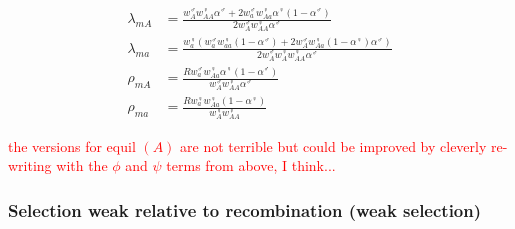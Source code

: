 \documentclass[12pt]{article}
\begin{document}
\begin{subequations}
\begin{align}
\lambda_{mA}&=\frac{w_{A}^\male w_{AA}^\female \alpha^\male + 2 w_{a}^\male w_{Aa}^\female \alpha^\female(1-\alpha^\male)}{2w_{A}^\male  w_{AA}^\female \alpha^\male} \\
\lambda_{ma}&=\frac{w_{a}^\female(w_{a}^\male w_{aa}^\female (1-\alpha^\male) + 2 w_{A}^\male w_{Aa}^\female(1-\alpha^\female)\alpha^\male)}{2w_{A}^\male w_{A}^\female w_{AA}^\female \alpha^\male} \\
\rho_{mA}&= \frac{R w_{a}^\male w_{Aa}^\female \alpha^\female(1-\alpha^\male)}{w_{A}^\male w_{AA}^
\female \alpha^\male} \\
\rho_{ma}&= \frac{R w_{a}^\female w_{Aa}^\female (1-\alpha^\female)}{w_{A}^\female w_{AA}^
\female} 
\end{align}
\end{subequations}


\textcolor{red}{the versions for equil $(A)$ are not terrible but could be improved by cleverly re-writing with the $\phi$ and $\psi$ terms from above, I think...}


\subsubsection*{Selection weak relative to recombination (weak selection)}



\newpage

\end{document}
